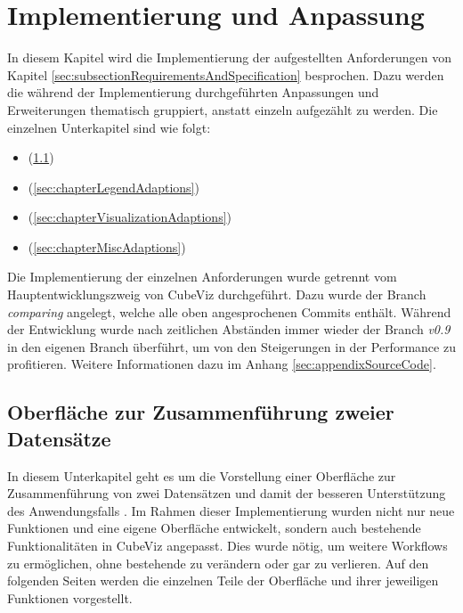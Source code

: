 \documentclass[11pt]{article}
\newcommand{\com}[1]{\marginpar{\em {\small{#1}}}} %
\begin{document}
%
%
\clearpage
\newpage
\section{Implementierung und Anpassung}
\label{sec:chapterImplemenation}

In diesem Kapitel wird die Implementierung der aufgestellten Anforderungen von Kapitel \ref{sec:subsectionRequirementsAndSpecification} besprochen. Dazu werden die während der Implementierung durchgeführten Anpassungen und Erweiterungen thematisch gruppiert, anstatt einzeln aufgezählt zu werden. Die einzelnen Unterkapitel sind wie folgt:

\begin{itemize}
    \item {} (\ref{sec:chapterUIMergeDatasets})

    \item {} (\ref{sec:chapterLegendAdaptions})
    
    \item {} (\ref{sec:chapterVisualizationAdaptions})
    
    \item {} (\ref{sec:chapterMiscAdaptions})
\end{itemize}

Die Implementierung der einzelnen Anforderungen wurde getrennt vom\com{Branch:\\ comparing} Hauptentwicklungszweig von CubeViz durchgeführt. Dazu wurde der Branch \textit{comparing} angelegt, welche alle oben angesprochenen Commits enthält. Während der Entwicklung wurde nach zeitlichen Abständen immer wieder der Branch \textit{v0.9} in den eigenen Branch überführt, um von den Steigerungen in der Performance zu profitieren. Weitere\com{Anhang \ref{sec:appendixSourceCode} \\ S. \pageref{sec:appendixSourceCode}} Informationen dazu im Anhang \ref{sec:appendixSourceCode}. 

%
%
\subsection{Oberfläche zur Zusammenführung zweier Datensätze}
\label{sec:chapterUIMergeDatasets}

In diesem Unterkapitel geht es um die Vorstellung einer Oberfläche zur Zusammenführung von zwei Datensätzen und damit der besseren Unterstützung des Anwendungsfalls . Im Rahmen dieser Implementierung wurden nicht nur neue Funktionen und eine eigene Oberfläche entwickelt, sondern auch bestehende Funktionalitäten in CubeViz angepasst. Dies wurde nötig, um weitere Workflows zu ermöglichen, ohne bestehende zu verändern oder gar zu verlieren. Auf den folgenden Seiten werden die einzelnen Teile der Oberfläche und ihrer jeweiligen Funktionen vorgestellt. \\
\end{document}
